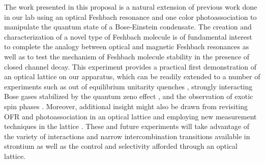 The work presented in this proposal is a natural extension of previous work done in our lab using an optical Feshbach resonance and one color photoassociation to manipulate the quantum state of a Bose-Einstein condensate. The creation and characterization of a novel type of Feshbach molecule is of fundamental interest to complete the analogy between optical and magnetic Feshbach resonances as well as to test the mechanism of Feshbach molecule stability in the presence of closed channel decay. This experiment provides a practical first demonstration of an optical lattice on our apparatus, which can be readily extended to a number of experiments such as out of equilibrium unitarity quenches \cite{Makotyn2014}, strongly interacting Bose gases stabilized by the quantum zeno effect \cite{Fischer2001,Zhu2014,Daley2009,Syassen2008}, and the observation of exotic spin phases \cite{Beverland2016,Cazalilla2014,Chen2015}. Moreover, additional insight might also be drawn from revisiting OFR and photoassociation in an optical lattice and employing new measurement techniques in the lattice \cite{Taie2016}. These and future experiments will take advantage of the variety of interactions and narrow intercombination transitions available in strontium as well as the control and selectivity afforded through an optical lattice.